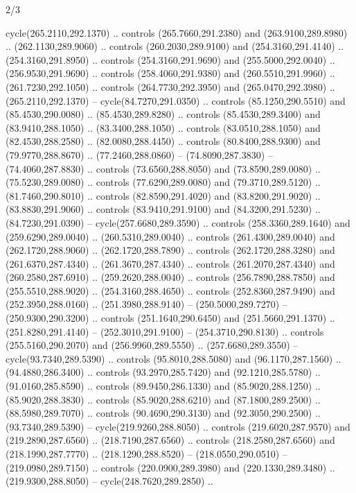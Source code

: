 \begin{flagdescription}{2/3}
\begin{scope}[xshift=0.5\flaglength,yshift=0.5\flagwidth,scale=\stretchfactor]
\begin{scope}[scale=0.001645\flagwidth,yshift=65mm,xshift=-63mm]
\begin{scope}[y=0.80pt, x=0.80pt, yscale=-1,]
\begin{scope}[cm={{1.33333,0.0,0.0,1.33333,(0.0,1e-05)}}]
  cycle(265.2110,292.1370) .. controls (265.7660,291.2380) and
  (263.9100,289.8980) .. (262.1130,289.9060) .. controls (260.2030,289.9100) and
  (254.3160,291.4140) .. (254.3160,291.8950) .. controls (254.3160,291.9690) and
  (255.5000,292.0040) .. (256.9530,291.9690) .. controls (258.4060,291.9380) and
  (260.5510,291.9960) .. (261.7230,292.1050) .. controls (264.7730,292.3950) and
  (265.0470,292.3980) .. (265.2110,292.1370) -- cycle(84.7270,291.0350) ..
  controls (85.1250,290.5510) and (85.4530,290.0080) .. (85.4530,289.8280) ..
  controls (85.4530,289.3400) and (83.9410,288.1050) .. (83.3400,288.1050) ..
  controls (83.0510,288.1050) and (82.4530,288.2580) .. (82.0080,288.4450) ..
  controls (80.8400,288.9300) and (79.9770,288.8670) .. (77.2460,288.0860) --
  (74.8090,287.3830) -- (74.4060,287.8830) .. controls (73.6560,288.8050) and
  (73.8590,289.0080) .. (75.5230,289.0080) .. controls (77.6290,289.0080) and
  (79.3710,289.5120) .. (81.7460,290.8010) .. controls (82.8590,291.4020) and
  (83.8200,291.9020) .. (83.8830,291.9060) .. controls (83.9410,291.9100) and
  (84.3200,291.5230) .. (84.7230,291.0390) -- cycle(257.6680,289.3590) ..
  controls (258.3360,289.1640) and (259.6290,289.0040) .. (260.5310,289.0040) ..
  controls (261.4300,289.0040) and (262.1720,288.9060) .. (262.1720,288.7890) ..
  controls (262.1720,288.3280) and (261.6370,287.4340) .. (261.3670,287.4340) ..
  controls (261.2070,287.4340) and (260.2580,287.6910) .. (259.2620,288.0040) ..
  controls (256.7890,288.7850) and (255.5510,288.9020) .. (254.3160,288.4650) ..
  controls (252.8360,287.9490) and (252.3950,288.0160) .. (251.3980,288.9140) --
  (250.5000,289.7270) -- (250.9300,290.3200) .. controls (251.1640,290.6450) and
  (251.5660,291.1370) .. (251.8280,291.4140) -- (252.3010,291.9100) --
  (254.3710,290.8130) .. controls (255.5160,290.2070) and (256.9960,289.5550) ..
  (257.6680,289.3550) -- cycle(93.7340,289.5390) .. controls (95.8010,288.5080)
  and (96.1170,287.1560) .. (94.4880,286.3400) .. controls (93.2970,285.7420)
  and (92.1210,285.5780) .. (91.0160,285.8590) .. controls (89.9450,286.1330)
  and (85.9020,288.1250) .. (85.9020,288.3830) .. controls (85.9020,288.6210)
  and (87.1800,289.2500) .. (88.5980,289.7070) .. controls (90.4690,290.3130)
  and (92.3050,290.2500) .. (93.7340,289.5390) -- cycle(219.9260,288.8050) ..
  controls (219.6020,287.9570) and (219.2890,287.6560) .. (218.7190,287.6560) ..
  controls (218.2580,287.6560) and (218.1990,287.7770) .. (218.1290,288.8520) --
  (218.0550,290.0510) -- (219.0980,289.7150) .. controls (220.0900,289.3980) and
  (220.1330,289.3480) .. (219.9300,288.8050) -- cycle(248.7620,289.2850) ..

\end{scope}
\end{scope}
\end{scope}
\end{scope}
\end{flagdescription}
